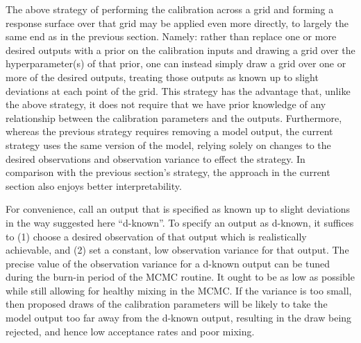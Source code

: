 \documentclass{article}
\begin{document}
The above strategy of performing the calibration across a grid and forming a response surface over that grid may be applied even more directly, to largely the same end as in the previous section. Namely: rather than replace one or more desired outputs with a prior on the calibration inputs and drawing a grid over the hyperparameter(s) of that prior, one can instead simply draw a grid over one or more of the desired outputs, treating those outputs as known up to slight deviations at each point of the grid. This strategy has the advantage that, unlike the above strategy, it does not require that we have prior knowledge of any relationship between the calibration parameters and the outputs. Furthermore, whereas the previous strategy requires removing a model output, the current strategy uses the same version of the model, relying solely on changes to the desired observations and observation variance to effect the strategy. In comparison with the previous section's strategy, the approach in the current section also enjoys better interpretability.

For convenience, call an output that is specified as known up to slight deviations in the way suggested here ``d-known''. To specify an output as d-known, it suffices to (1) choose a desired observation of that output which is realistically achievable, and (2) set a constant, low observation variance for that output. The precise value of the observation variance for a d-known output can be tuned during the burn-in period of the MCMC routine. It ought to be as low as possible while still allowing for healthy mixing in the MCMC. If the variance is too small, then proposed draws of the calibration parameters will be likely to take the model output too far away from the d-known output, resulting in the draw being rejected, and hence low acceptance rates and poor mixing.
\end{document}
